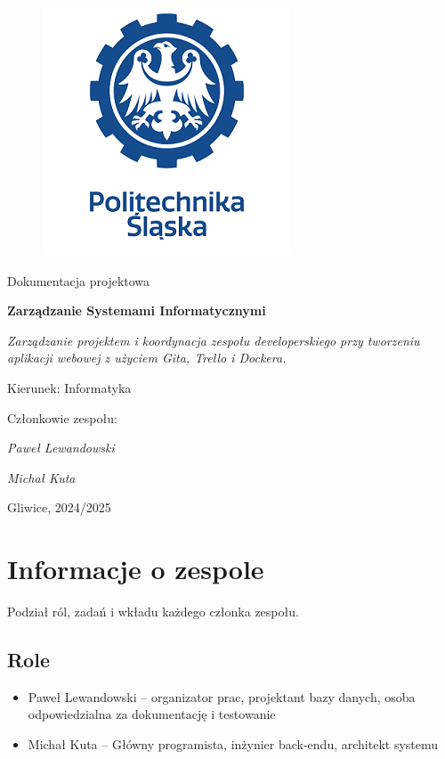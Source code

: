 \documentclass[12pt,a4paper]{article}
\def\projectName{Zarządzanie projektem i koordynacja zespołu developerskiego przy tworzeniu aplikacji webowej z użyciem Gita, Trello i Dockera.}
\def\authorA{Paweł Lewandowski}
\def\authorB{Michał Kuta}
\begin{document}
\clearpage
	\begin{figure}[h]
		\centering
		\includegraphics[width=0.5\linewidth]{media/ps-logo.png}
	\end{figure}

\hspace{3cm}
	\begin{center}Dokumentacja projektowa\end{center}
	\hspace{3cm}
	\begin{center}\large\textbf{Zarządzanie Systemami Informatycznymi}\end{center}
	\begin{center}\large\textit{\projectName}\end{center}

\hspace{7cm}
	\begin{flushright}Kierunek: Informatyka
		\end{flushright}
		\begin{flushright}Członkowie zespołu:
		\par
		\textit{\authorA}
		\par
		\textit{\authorB}
	\end{flushright}
\vfill
	\begin{center}Gliwice, 2024/2025\end{center}

\newpage
{}
\tableofcontents
\newpage

\section{Informacje o zespole}
Podział ról, zadań i wkładu każdego członka zespołu.

\subsection{Role}
\begin{itemize}
    \item Paweł Lewandowski – organizator prac, projektant bazy danych, osoba odpowiedzialna za dokumentację i testowanie
    \item Michał Kuta – Główny programista, inżynier back-endu, architekt systemu
\end{itemize}
\end{document}
